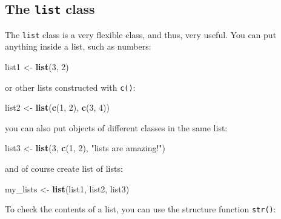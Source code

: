 \documentclass[
]{article}
\newenvironment{Shaded}{\begin{snugshade}}{\end{snugshade}}
\newcommand{\DecValTok}[1]{\textcolor[rgb]{0.00,0.00,0.81}{#1}}
\newcommand{\KeywordTok}[1]{\textcolor[rgb]{0.13,0.29,0.53}{\textbf{#1}}}
\newcommand{\NormalTok}[1]{#1}
\newcommand{\StringTok}[1]{\textcolor[rgb]{0.31,0.60,0.02}{#1}}
\begin{document}
\hypertarget{the-list-class}{%
\subsection{\texorpdfstring{The \texttt{list} class}{The list class}}\label{the-list-class}}

The \texttt{list} class is a very flexible class, and thus, very useful. You can put anything inside a list,
such as numbers:

\begin{Shaded}
\begin{Highlighting}[]
\NormalTok{list1 \textless{}{-}}\StringTok{ }\KeywordTok{list}\NormalTok{(}\DecValTok{3}\NormalTok{, }\DecValTok{2}\NormalTok{)}
\end{Highlighting}
\end{Shaded}

or other lists constructed with \texttt{c()}:

\begin{Shaded}
\begin{Highlighting}[]
\NormalTok{list2 \textless{}{-}}\StringTok{ }\KeywordTok{list}\NormalTok{(}\KeywordTok{c}\NormalTok{(}\DecValTok{1}\NormalTok{, }\DecValTok{2}\NormalTok{), }\KeywordTok{c}\NormalTok{(}\DecValTok{3}\NormalTok{, }\DecValTok{4}\NormalTok{))}
\end{Highlighting}
\end{Shaded}

you can also put objects of different classes in the same list:

\begin{Shaded}
\begin{Highlighting}[]
\NormalTok{list3 \textless{}{-}}\StringTok{ }\KeywordTok{list}\NormalTok{(}\DecValTok{3}\NormalTok{, }\KeywordTok{c}\NormalTok{(}\DecValTok{1}\NormalTok{, }\DecValTok{2}\NormalTok{), }\StringTok{"lists are amazing!"}\NormalTok{)}
\end{Highlighting}
\end{Shaded}

and of course create list of lists:

\begin{Shaded}
\begin{Highlighting}[]
\NormalTok{my\_lists \textless{}{-}}\StringTok{ }\KeywordTok{list}\NormalTok{(list1, list2, list3)}
\end{Highlighting}
\end{Shaded}

To check the contents of a list, you can use the structure function \texttt{str()}:
\end{document}
